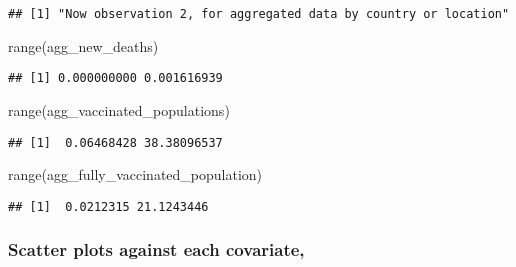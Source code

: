 \documentclass[
  12pt,
]{article}
\newenvironment{Shaded}{\begin{snugshade}}{\end{snugshade}}
\newcommand{\AttributeTok}[1]{\textcolor[rgb]{0.77,0.63,0.00}{#1}}
\newcommand{\FunctionTok}[1]{\textcolor[rgb]{0.00,0.00,0.00}{#1}}
\newcommand{\NormalTok}[1]{#1}
\newcommand{\SpecialCharTok}[1]{\textcolor[rgb]{0.00,0.00,0.00}{#1}}
\newcommand{\StringTok}[1]{\textcolor[rgb]{0.31,0.60,0.02}{#1}}
\begin{document}
\begin{verbatim}
## [1] "Now observation 2, for aggregated data by country or location"
\end{verbatim}

\begin{Shaded}
\begin{Highlighting}[]
\FunctionTok{range}\NormalTok{(agg\_new\_deaths)}
\end{Highlighting}
\end{Shaded}

\begin{verbatim}
## [1] 0.000000000 0.001616939
\end{verbatim}

\begin{Shaded}
\begin{Highlighting}[]
\FunctionTok{range}\NormalTok{(agg\_vaccinated\_populations)}
\end{Highlighting}
\end{Shaded}

\begin{verbatim}
## [1]  0.06468428 38.38096537
\end{verbatim}

\begin{Shaded}
\begin{Highlighting}[]
\FunctionTok{range}\NormalTok{(agg\_fully\_vaccinated\_population)}
\end{Highlighting}
\end{Shaded}

\begin{verbatim}
## [1]  0.0212315 21.1243446
\end{verbatim}

\hypertarget{scatter-plots-against-each-covariate}{%
\subsubsection{Scatter plots against each
covariate,}\label{scatter-plots-against-each-covariate}}

\begin{Shaded}
\end{Shaded}
\end{document}
